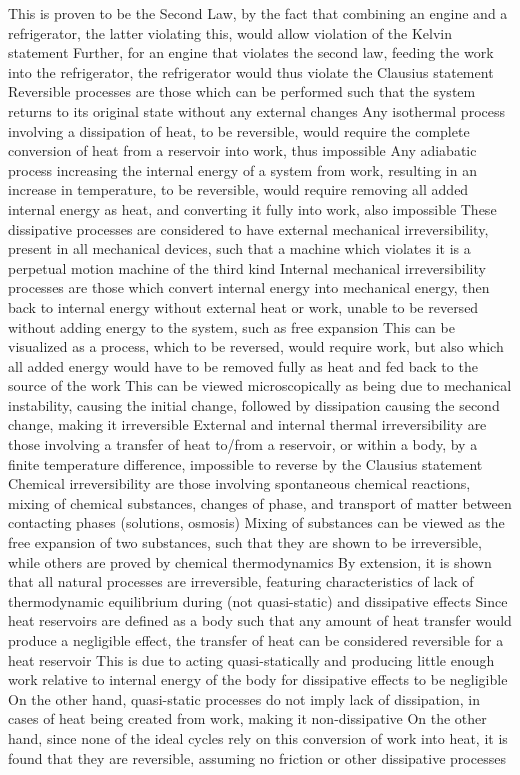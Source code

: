 \documentclass[11 pt, twoside]{article}
\newenvironment{outline*}
{
	\begin{outline}[enumerate]
	}
	{\end{outline}
}
\begin{document}
\begin{outline*}
\3 This is proven to be the Second Law, by the fact that combining an engine and a refrigerator, the latter violating this, would allow violation of the Kelvin statement
\3 Further, for an engine that violates the second law, feeding the work into the refrigerator, the refrigerator would thus violate the Clausius statement
\1 Reversible processes are those which can be performed such that the system returns to its original state without any external changes
\2 Any isothermal process involving a dissipation of heat, to be reversible, would require the complete conversion of heat from a reservoir into work, thus impossible
\3 Any adiabatic process increasing the internal energy of a system from work, resulting in an increase in temperature, to be reversible, would require removing all added internal energy as heat, and converting it fully into work, also impossible
\3 These dissipative processes are considered to have external mechanical irreversibility, present in all mechanical devices, such that a machine which violates it is a perpetual motion machine of the third kind
\2 Internal mechanical irreversibility processes are those which convert internal energy into mechanical energy, then back to internal energy without external heat or work, unable to be reversed without adding energy to the system, such as free expansion
\3 This can be visualized as a process, which to be reversed, would require work, but also which all added energy would have to be removed fully as heat and fed back to the source of the work
\3 This can be viewed microscopically as being due to mechanical instability, causing the initial change, followed by dissipation causing the second change, making it irreversible
\2 External and internal thermal irreversibility are those involving a transfer of heat to/from a reservoir, or within a body, by a finite temperature difference, impossible to reverse by the Clausius statement
\2 Chemical irreversibility are those involving spontaneous chemical reactions, mixing of chemical substances, changes of phase, and transport of matter between contacting phases (solutions, osmosis)
\3 Mixing of substances can be viewed as the free expansion of two substances, such that they are shown to be irreversible, while others are proved by chemical thermodynamics
\2 By extension, it is shown that all natural processes are irreversible, featuring characteristics of lack of thermodynamic equilibrium during (not quasi-static) and dissipative effects
\3 Since heat reservoirs are defined as a body such that any amount of heat transfer would produce a negligible effect, the transfer of heat can be considered reversible for a heat reservoir
\4 This is due to acting quasi-statically and producing little enough work relative to internal energy of the body for dissipative effects to be negligible
\3 On the other hand, quasi-static processes do not imply lack of dissipation, in cases of heat being created from work, making it non-dissipative
\3 On the other hand, since none of the ideal cycles rely on this conversion of work into heat, it is found that they are reversible, assuming no friction or other dissipative processes
\end{outline*}
\end{document}
